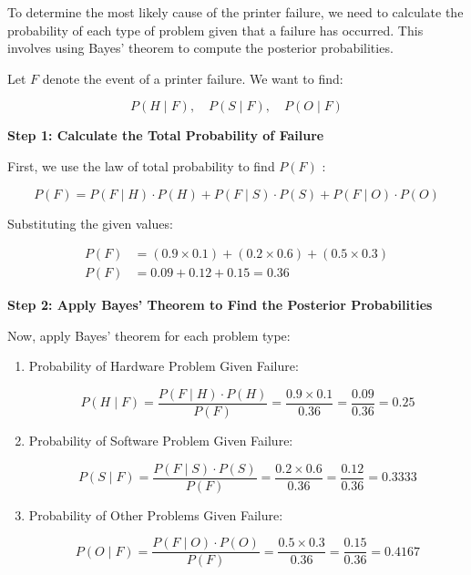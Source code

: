 \begin{solution}
    To determine the most likely cause of the printer failure, we need to calculate the probability of each type of problem given that a failure has occurred. This involves using Bayes' theorem to compute the posterior probabilities.

Let $F$ denote the event of a printer failure. We want to find:

\[
P(H \mid F), \quad P(S \mid F), \quad P(O \mid F)
\]

\textbf{Step 1: Calculate the Total Probability of Failure
}

First, we use the law of total probability to find $P(F)$ :

\[
P(F) = P(F \mid H) \cdot P(H) + P(F \mid S) \cdot P(S) + P(F \mid O) \cdot P(O)
\]

Substituting the given values:

\[
\begin{aligned}
P(F) &= (0.9 \times 0.1) + (0.2 \times 0.6) + (0.5 \times 0.3) \\
P(F) &= 0.09 + 0.12 + 0.15 = 0.36
\end{aligned}
\]

\textbf{Step 2: Apply Bayes' Theorem to Find the Posterior Probabilities
}

Now, apply Bayes' theorem for each problem type:

\begin{enumerate}
    \item Probability of Hardware Problem Given Failure: \vspace{10pt}
    
    \[
    P(H \mid F)=\frac{P(F \mid H) \cdot P(H)}{P(F)}=\frac{0.9 \times 0.1}{0.36}=\frac{0.09}{0.36}=0.25
    \]
    \vspace{10pt}
    \item Probability of Software Problem Given Failure: \vspace{10pt}
    
    \[
    P(S \mid F)=\frac{P(F \mid S) \cdot P(S)}{P(F)}=\frac{0.2 \times 0.6}{0.36}=\frac{0.12}{0.36}=0.3333
    \]
    \vspace{10pt}
    \item Probability of Other Problems Given Failure: \vspace{10pt}
    
    \[
    P(O \mid F)=\frac{P(F \mid O) \cdot P(O)}{P(F)}=\frac{0.5 \times 0.3}{0.36}=\frac{0.15}{0.36}=0.4167
    \]
    \vspace{10pt}
\end{enumerate}


\end{solution}
